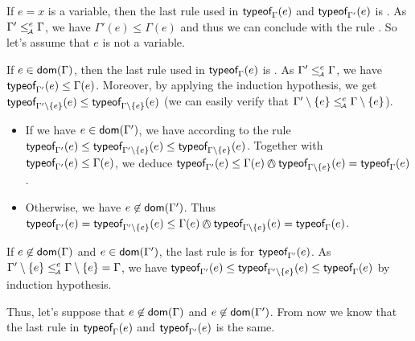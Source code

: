 \documentclass[a4paper]{article}
\theoremstyle{definition}
\begin{document}
  If $e=x$ is a variable, then the last rule used in $\textsf{typeof}_{\Gamma}(e)$ and $\textsf{typeof}_{\Gamma'}(e)$ is .
  As $\Gamma' \leq_{\!\scriptscriptstyle\mathcal{A}}^e \Gamma$, we have $\Gamma'(e) \leq \Gamma(e)$ and thus
  we can conclude with the rule .
  So let's assume that $e$ is not a variable.

  If $e\in\textsf{dom}(\Gamma)$, then the last rule used in $\textsf{typeof}_{\Gamma}(e)$ is .
  As $\Gamma' \leq_{\!\scriptscriptstyle\mathcal{A}}^e \Gamma$, we have $\textsf{typeof}_{\Gamma'}(e) \leq \Gamma(e)$.
  Moreover, by applying the induction hypothesis, we get $\textsf{typeof}_{\Gamma'\setminus \{e\}}(e) \leq \textsf{typeof}_{\Gamma\setminus \{e\}}(e)$
  (we can easily verify that $\Gamma'\setminus\{e\} \leq_{\!\scriptscriptstyle\mathcal{A}}^e \Gamma\setminus\{e\}$).
  \begin{itemize}
    \item If we have $e\in\textsf{dom}(\Gamma')$, we have according to the rule 
    $\textsf{typeof}_{\Gamma'}(e) \leq \textsf{typeof}_{\Gamma'\setminus \{e\}}(e) \leq \textsf{typeof}_{\Gamma\setminus \{e\}}(e)$.
    Together with $\textsf{typeof}_{\Gamma'}(e) \leq \Gamma(e)$,
    we deduce $\tyof e {\Gamma'} \leq \Gamma(e) \tsand \tyof e {\Gamma\setminus \{e\}} = \tyof e {\Gamma}$.
    \item  Otherwise, we have $e\not\in\textsf{dom}(\Gamma')$. Thus
    $\tyof e {\Gamma'} = \tyof e {\Gamma'\setminus \{e\}} \leq \Gamma(e) \tsand \tyof e {\Gamma\setminus \{e\}}=\tyof e {\Gamma}$.
  \end{itemize}

  If $e\not\in\textsf{dom}(\Gamma)$ and $e\in\textsf{dom}(\Gamma')$, the last rule is  for $\textsf{typeof}_{\Gamma'}(e)$.
  As $\Gamma'\setminus\{e\} \leq_{\!\scriptscriptstyle\mathcal{A}}^e \Gamma\setminus\{e\} = \Gamma$,
  we have $\textsf{typeof}_{\Gamma'}(e) \leq \textsf{typeof}_{\Gamma'\setminus \{e\}}(e) \leq \textsf{typeof}_{\Gamma}(e)$ by induction hypothesis.

  Thus, let's suppose that $e\not\in\textsf{dom}(\Gamma)$ and $e\not\in\textsf{dom}(\Gamma')$.
  From now we know that the last rule in $\textsf{typeof}_{\Gamma}(e)$ and $\textsf{typeof}_{\Gamma'}(e)$ is the same.
\end{document}
